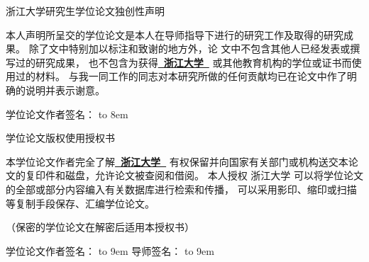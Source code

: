   \vspace*{-2mm}

  {\songti

  \begin{center}
    {\noindent\songti{}浙江大学研究生学位论文独创性声明}\\
  \end{center}

  {\setlength{\baselineskip}{1.3\baselineskip}
  本人声明所呈交的学位论文是本人在导师指导下进行的研究工作及取得的研究成果。
  除了文中特别加以标注和致谢的地方外，论
  文中不包含其他人已经发表或撰写过的研究成果，
  也不包含为获得{\bfseries\kaishu{}\underline{~浙江大学~}}
  或其他教育机构的学位或证书而使用过的材料。
  与我一同工作的同志对本研究所做的任何贡献均已在论文中作了明确的说明并表示谢意。

  \vspace{10ex}

  {\songti{}学位论文作者签名：
  	{\hbox to 8em{}}
  \PutsigndateA}
  
  \vspace{12ex}

  \begin{center}
    {\noindent\songti{}学位论文版权使用授权书}
  \end{center}

  本学位论文作者完全了解{\bfseries\kaishu{}\underline{~浙江大学~}}
  有权保留并向国家有关部门或机构送交本论文的复印件和磁盘，允许论文被查阅和借阅。
  本人授权 浙江大学 可以将学位论文的全部或部分内容编入有关数据库进行检索和传播，
  可以采用影印、缩印或扫描等复制手段保存、汇编学位论文。

  （保密的学位论文在解密后适用本授权书）

  \vspace{2ex}

  学位论文作者签名：
  {\hbox to 9em{}}
  导师签名：
  {\hbox to 9em{}}

  \vspace{2ex}

  \PutsigndateB
  \hspace{3em}
  \PutsigndateC}
  }
